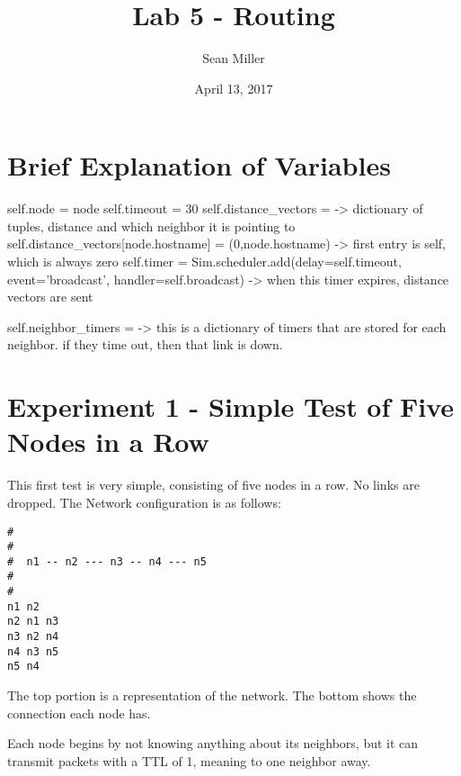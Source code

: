 \documentclass[fleqn,11pt]{article}
\begin{document}
\lstset{
  language=Python,
  basicstyle=\small,          %
  keywordstyle=\bfseries,
  identifierstyle=,           %
  commentstyle=,              %
  stringstyle=\ttfamily,      %
  showstringspaces=false,     %
  numbers=left,
  numberstyle=\tiny,
  numbersep=5pt,
  frame=tb,
}

\title{Lab 5 - Routing}

\author{Sean Miller}

\date{April 13, 2017}

\maketitle

\section{Brief Explanation of Variables}
self.node = node 
self.timeout = 30
self.distance_vectors = {} -> dictionary of tuples, distance and which neighbor it is pointing to
self.distance_vectors[node.hostname] = (0,node.hostname) -> first entry is self, which is always zero
self.timer = Sim.scheduler.add(delay=self.timeout, event='broadcast', handler=self.broadcast) -> when this timer expires, distance vectors are sent

self.neighbor_timers = {} -> this is a dictionary of timers that are stored for each neighbor. if they time out, then that link is down.

\section{Experiment 1 - Simple Test of Five Nodes in a Row}

This first test is very simple, consisting of five nodes in a row. No links are dropped. The Network configuration is as follows:

\begin{lstlisting}
#
#
#  n1 -- n2 --- n3 -- n4 --- n5
#
# 
n1 n2
n2 n1 n3
n3 n2 n4
n4 n3 n5
n5 n4
\end{lstlisting}

The top portion is a representation of the network. The bottom shows the connection each node has.

Each node begins by not knowing anything about its neighbors, but it can transmit packets with a TTL of 1, meaning to one neighbor away.
\end{document}
